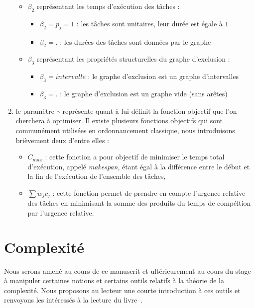 \documentclass[a4paper,11pt]{report}
\begin{document}
\begin{enumerate}
\begin{itemize}[label=$\bullet$]
            \item $\beta_2$ représentant les temps d'exécution des tâches :
                \begin{itemize}
                    \item $\beta_2 = p_j = 1$ : les tâches sont unitaires, leur durée est égale à
                        $1$
                    \item $\beta_2 = .$ : les durées des tâches sont données par le graphe
                \end{itemize}
            \item $\beta_3$ représentant les propriétés structurelles du graphe d'exclusion :
                \begin{itemize}
                    \item \textbf{$\beta_3 = intervalle$} : le graphe d'exclusion est un graphe d'intervalles
                    \item $\beta_3 = .$ : le graphe d'exclusion est un graphe vide (sans arêtes)
                \end{itemize}
        \end{itemize}
    \item le paramètre $\gamma$ représente quant à lui définit la fonction objectif que l'on
        cherchera à optimiser. Il existe plusieurs fonctions objectifs qui sont communément
        utilisées en ordonnancement classique, nous introduisons brièvement deux d'entre elles :
        \begin{itemize}
            \item $C_{max}$ : cette fonction a pour objectif de minimiser le temps total d'exécution,
                appelé \emph{makespan}, étant égal à la différence entre le début et la fin de
                l'exécution de l'ensemble des tâches,
            \item $\sum w_j c_j$ : cette fonction permet de prendre en compte l'urgence relative des
                tâches en minimisant la somme des produits du temps de compéltion par l'urgence
                relative.
        \end{itemize}
\end{enumerate}

\section{Complexité}

Nous serons amené au cours de ce manuscrit et ultérieurement au cours du stage à manipuler certaines
notions et certains outils relatifs à la théorie de la complexité. Nous proposons au lecteur une
courte introduction à ces outils et renvoyons les intéressés à la lecture du
livre~\cite{papadimitriou_computational_1993}.
\end{document}
